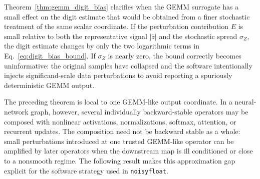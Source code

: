 \documentclass[manuscript, screen]{acmart}
\begin{document}
Theorem~\ref{thm:gemm_digit_bias} clarifies when the GEMM surrogate has a
small effect on the digit estimate that would be obtained from a finer
stochastic treatment of the same scalar coordinate. If the perturbation
contribution $E$ is small relative to both the representative signal
$|\overline{z}|$ and the stochastic spread $\sigma_Z$, the digit estimate
changes by only the two logarithmic terms in
Eq.~\eqref{eq:digit_bias_bound}. If $\sigma_Z$ is nearly zero, the bound
correctly becomes uninformative: the original samples have collapsed and the
software intentionally injects significand-scale data perturbations to avoid
reporting a spuriously deterministic GEMM output.

The preceding theorem is local to one GEMM-like output coordinate. In a
neural-network graph, however, several individually backward-stable operators
may be composed with nonlinear activations, normalizations, softmax, attention,
or recurrent updates. The composition need not be backward stable as a whole:
small perturbations introduced at one trusted GEMM-like operator can be
amplified by later operators when the downstream map is ill conditioned or
close to a nonsmooth regime. The following result makes this approximation
gap explicit for the software strategy used in \texttt{noisyfloat}.
\end{document}
